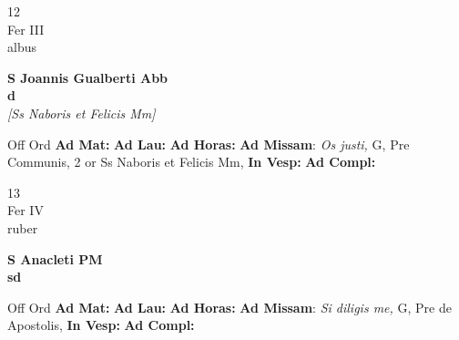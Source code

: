 \documentclass[10pt, openany]{book}
\begin{document}
        \begin{center}
            \begin{minipage}{3.5in}
                \vspace{2em}
                \begin{minipage}{0.5in}
                    {\Huge 12} \\
                    {\normalsize Fer III} \\
                    {\normalsize albus}
                \end{minipage}
                \begin{minipage}{3.0in}
                    \textbf{ \large S Joannis Gualberti Abb \\
                    \textnormal{\normalsize d}} \\ \textit{[Ss Naboris et Felicis Mm]} \\ 
                \end{minipage}
                \begin{justify}Off Ord
                    \textbf{Ad Mat: }
                    \textbf{Ad Lau: }
                    \textbf{Ad Horas: }\textbf{Ad Missam}: \textit{Os justi,} G, Pre Communis, 2 or Ss Naboris et Felicis Mm,  
                    \textbf{In Vesp: }
                    \textbf{Ad Compl: }
                \end{justify}
            \end{minipage}
        \end{center}
    
        \begin{center}
            \begin{minipage}{3.5in}
                \vspace{2em}
                \begin{minipage}{0.5in}
                    {\Huge 13} \\
                    {\normalsize Fer IV} \\
                    {\normalsize ruber}
                \end{minipage}
                \begin{minipage}{3.0in}
                    \textbf{ \large S Anacleti PM \\
                    \textnormal{\normalsize sd}} \\ 
                \end{minipage}
                \begin{justify}Off Ord
                    \textbf{Ad Mat: }
                    \textbf{Ad Lau: }
                    \textbf{Ad Horas: }\textbf{Ad Missam}: \textit{Si diligis me,} G, Pre de Apostolis,  
                    \textbf{In Vesp: }
                    \textbf{Ad Compl: }
                \end{justify}
            \end{minipage}
        \end{center}
    
\end{document}
